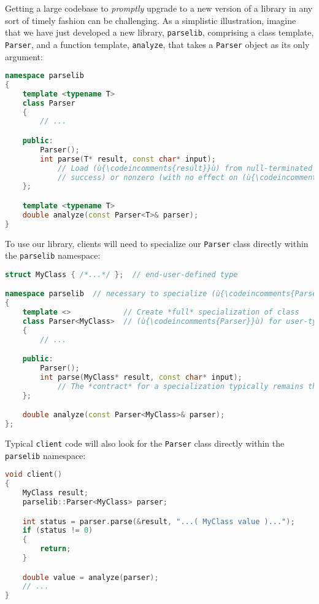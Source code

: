 Getting a large codebase to \emph{promptly} upgrade to a new version of
a library in any sort of timely fashion can be challenging. As a
simplistic illustration, imagine that we have just developed a new
library, \texttt{parselib}, comprising a class template, \texttt{Parser},
and a function template, \texttt{analyze}, that takes a \texttt{Parser}
object as its only argument:

\begin{lstlisting}[language=C++]
namespace parselib
{
    template <typename T>
    class Parser
    {
        // ...

    public:
        Parser();
        int parse(T* result, const char* input);
            // Load (ù{\codeincomments{result}}ù) from null-terminated (ù{\codeincomments{input}}ù); return (ù{\codeincomments{0}}ù) (on
            // success) or nonzero (with no effect on (ù{\codeincomments{result}}ù)).
    };

    template <typename T>
    double analyze(const Parser<T>& parser);
}
\end{lstlisting}

\noindent To use our library, clients will need to specialize our \texttt{Parser}
class directly within the \texttt{parselib} namespace:

\begin{lstlisting}[language=C++]
struct MyClass { /*...*/ };  // end-user-defined type

namespace parselib  // necessary to specialize (ù{\codeincomments{Parser}}ù)
{
    template <>            // Create *full* specialization of class
    class Parser<MyClass>  // (ù{\codeincomments{Parser}}ù) for user-type (ù{\codeincomments{MyClass}}ù).
    {
        // ...

    public:
        Parser();
        int parse(MyClass* result, const char* input);
            // The *contract* for a specialization typically remains the same.
    };

    double analyze(const Parser<MyClass>& parser);
};
\end{lstlisting}

\noindent Typical \texttt{client} code will also look for the \texttt{Parser}
class directly within the \texttt{parselib} namespace:

\begin{lstlisting}[language=C++]
void client()
{
    MyClass result;
    parselib::Parser<MyClass> parser;

    int status = parser.parse(&result, "...( MyClass value )...");
    if (status != 0)
    {
        return;
    }

    double value = analyze(parser);
    // ...
}
\end{lstlisting}

